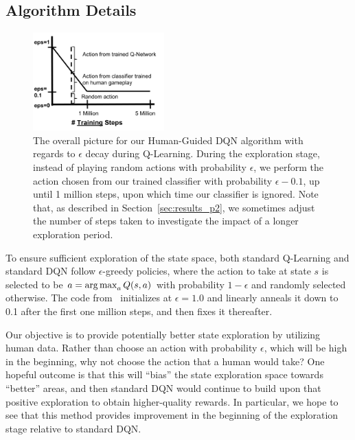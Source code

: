 \documentclass[letterpaper, 10pt, conference]{ieeeconf}
\begin{document}
\subsection{Algorithm Details}\label{ssec:algorithm}

\begin{figure}[t]
\centering
\includegraphics[width=0.45\textwidth]{figures/dqn_with_human_data_graph.png}
\caption{\footnotesize
The overall picture for our Human-Guided DQN algorithm with regards to
$\epsilon$ decay during Q-Learning. During the exploration stage, instead of
playing random actions with probability $\epsilon$, we perform the action chosen
from our trained classifier with probability $\epsilon-0.1$, up until 1 million
steps, upon which time our classifier is ignored. Note that, as described in
Section~\ref{sec:results_p2}, we sometimes adjust the number of steps taken to
investigate the impact of a longer exploration period.
}
\label{fig:human-guided-dqn}
\end{figure}

To ensure sufficient exploration of the state space, both standard Q-Learning
and standard DQN follow $\epsilon$-greedy policies, where the action to take at
state $s$ is selected to be $a = \operatorname*{arg\,max}_a Q(s,a)$ with probability $1-\epsilon$
and randomly selected otherwise. The code from~\cite{mnih-dqn-2015} initializes
at $\epsilon=1.0$ and linearly anneals it down to 0.1 after the first one
million steps, and then fixes it thereafter.

Our objective is to provide potentially better state exploration by utilizing
human data. Rather than choose an action with probability $\epsilon$, which will
be high in the beginning, why not choose the action that a human would take? One
hopeful outcome is that this will ``bias'' the state exploration space towards
``better'' areas, and then standard DQN would continue to build upon that
positive exploration to obtain higher-quality rewards. In particular, we hope to
see that this method provides improvement in the beginning of the exploration
stage relative to standard DQN.
\end{document}

